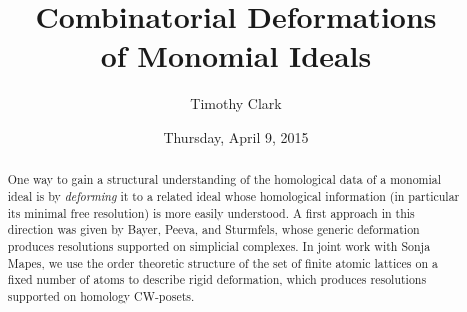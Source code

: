 \documentclass{UAmathtalk}
\author{Timothy Clark}
\title{Combinatorial Deformations\\ of Monomial Ideals}
\date{Thursday, April 9, 2015}
\begin{document}
\maketitle

\begin{abstract}
One way to gain a structural understanding of the homological data of a monomial ideal is by \emph{deforming} it to a related ideal whose homological information (in particular its minimal free resolution) is more easily understood. A first approach in this direction was given by Bayer, Peeva, and Sturmfels, whose generic deformation produces resolutions supported on simplicial complexes. In joint work with Sonja Mapes, we use the order theoretic structure of the set of finite atomic lattices on a fixed number of atoms to describe rigid deformation, which produces resolutions supported on homology CW-posets. 
\end{abstract}
\end{document}
